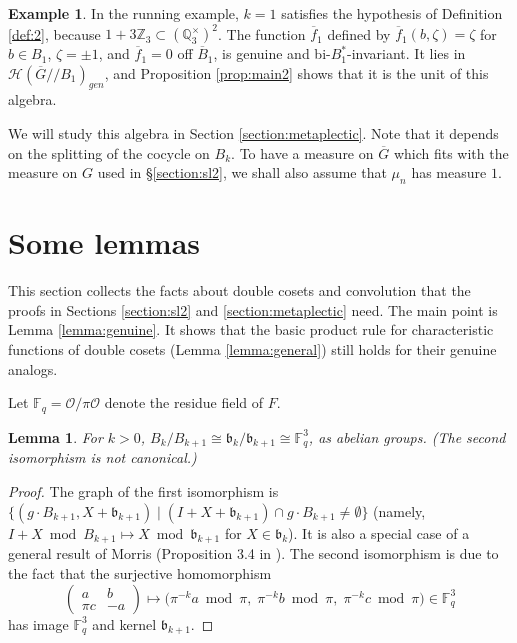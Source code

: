 \documentclass[12pt,letterpaper,reqno]{amsart}
\let\cal\mathcal
\let\Bbb\mathbb
\let\frak\mathfrak
\newtheorem{lemma}[theorem]{Lemma}
\theoremstyle{definition}
\newtheorem{example}[theorem]{Example}
\theoremstyle{remark}
\numberwithin{equation}{section}
\begin{document}
\begin{example}
\label{ex:def2}
In the running example, $k=1$ satisfies the hypothesis of Definition
\ref{def:2}, because $1+3\mathbb{Z}_3\subset(\mathbb{Q}_3^\times)^2$. The
function $\overline{f}_1$ defined by $\overline{f}_1(b,\zeta)=\zeta$ for
$b\in B_1$, $\zeta=\pm1$, and $\overline{f}_1=0$ off $\overline{B}_1$, is
genuine and bi-$B_1^*$-invariant. It lies in
${\cal H}(\overline{G}//B_1)_{gen}$, and Proposition \ref{prop:main2} shows
that it is the unit of this algebra.
\end{example}

We will study this algebra in Section \ref{section:metaplectic}. Note that it
depends on the splitting of the cocycle on $B_k$. To have a measure on
$\overline{G}$ which fits with the measure on $G$ used in
\S \ref{section:sl2}, we shall also assume that $\mu_n$ has measure $1$.

\section{Some lemmas}
\label{sec:lemmas}

This section collects the facts about double cosets and convolution that the
proofs in Sections \ref{section:sl2} and \ref{section:metaplectic} need. The
main point is Lemma \ref{lemma:genuine}. It shows that the basic product rule
for characteristic functions of double cosets (Lemma \ref{lemma:general})
still holds for their genuine analogs.

Let ${\Bbb{F}}_q={\cal O}/\pi{\cal O}$ denote the residue field of $F$.

\begin{lemma}
\label{lemma:3}
For $k>0$, $B_k/B_{k+1}\cong {\frak{b}}_k/{\frak{b}}_{k+1}\cong {\Bbb F}_q^3$,
as abelian groups. (The second isomorphism is not canonical.)
\end{lemma}

\begin{proof}
The graph of the first isomorphism is
$\{(g\cdot B_{k+1},X+ {\frak{b}}_{k+1}) \mid
(I+X+{\frak{b}}_{k+1})\cap g\cdot B_{k+1}\neq \emptyset\}$
(namely, $I+X \bmod B_{k+1} \mapsto X \bmod {\frak{b}}_{k+1}$ for
$X\in {\frak{b}}_k$). It is also a special case of a general result of Morris
(Proposition 3.4 in \cite{Mo88}). The second isomorphism is due to the fact that
the surjective homomorphism
\[
\begin{pmatrix}
a & b\\
\pi c & -a
\end{pmatrix}\longmapsto
\bigl(\pi^{-k}a \bmod \pi,\; \pi^{-k}b \bmod \pi,\; \pi^{-k}c \bmod \pi\bigr)
\in {\Bbb F}_q^3
\]
has image ${\Bbb F}_q^3$ and kernel ${\frak{b}}_{k+1}$.
\end{proof}
\end{document}
